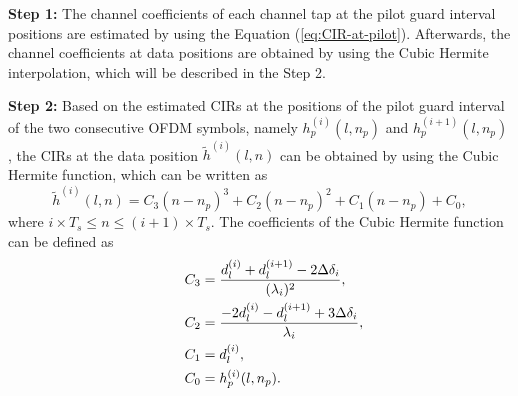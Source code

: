 \documentclass[AMA]{WileyNJD-v1}
\begin{document}
\rm{\textbf {Step 1:} The channel coefficients of each channel tap at the pilot guard interval positions are estimated by using the Equation (\ref{eq:CIR-at-pilot}). Afterwards, the channel coefficients at data positions are obtained by using the Cubic Hermite interpolation, which will be described in the Step 2. 
		
		
\rm{\textbf {Step 2:} Based on the estimated CIRs at the positions of the pilot guard interval of the two consecutive OFDM symbols, namely $h^{(i)}_{p}(l,n_p)$ and $h^{(i+1)}_{p}(l,n_p)$,  the CIRs at the data position $\tilde h^{(i)}(l,n)$  can be obtained  by using the Cubic Hermite function, which can be written as 
%
\begin{equation}\label{eq:cubic-hermite}
			\tilde h^{(i)}(l,n) = C_3(n - n_{p})^3 + C_2(n - n_{p})^2 + C_1(n-n_{p}) + C_0,
\end{equation}
%
where $i\times T_{s}\leq n\leq (i+1)\times T_{s}$. The coefficients of the Cubic Hermite function can be defined as
\begin{align*}
			\centering
			C_3 &= \frac{d^{(i)}_{l}+d^{(i+1)}_{l}-2{\Delta {\delta _i}}}{(\lambda_{i})^2},\\
			C_2 &= \dfrac{-2d^{(i)}_{l}-d^{(i+1)}_{l}+3{\Delta {\delta _i}}}{\lambda_{i}},\\
			\qquad C_1 &=d^{(i)}_{l},\\
			C_0 &= h^{(i)}_{p}(l,n_p).
\end{align*}	
%
			
}}
\end{document}
